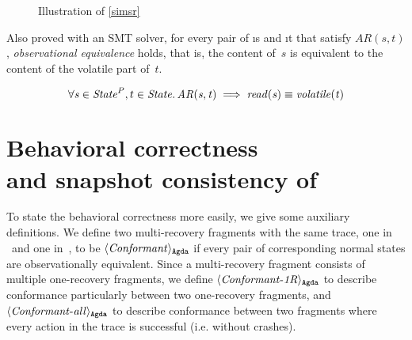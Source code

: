 	\begin{figure}[h] \centering
{}
		\caption{Illustration of \cref{simsr}}
\label{fig:sketch1}
	\end{figure}

Also proved with an SMT solver, for every pair of \i{s \in \ProgInvState} and \i{t \in \SpecState} that satisfy $AR(s,t)$, \emph{observational equivalence} holds, that is, the content of~$s$ is equivalent to the content of the volatile part of~$t$.
\begin{assumption}\label{ObsEquiv}
    $$
    \forall \mathit{s} \in \mathit{State}^P,t \in \mathit{State} \ldotp
    \mathit{AR(s, t)} \implies \mathit{read(s)} \equiv \mathit{volatile(t)}
    $$
\end{assumption}

\section{Behavioral correctness\\ and snapshot consistency of \ProgInv}

To state the behavioral correctness more easily, we give some auxiliary definitions. We define two multi-recovery fragments with the same trace, one in \Prog\ and one in~\Spec, to be $\langle \mathit{Conformant} \rangle_\mathtt{Agda}$ if every pair of corresponding normal states are observationally equivalent.
Since a multi-recovery fragment consists of multiple one-recovery fragments, we define $\langle \mathit{Conformant{\text-}1R} \rangle_\mathtt{Agda}$ to describe conformance particularly between two one-recovery fragments, and $\langle \mathit{Conformant{\text-}all} \rangle_\mathtt{Agda}$ to describe conformance between two fragments where every action in the trace is successful (i.e. without crashes).\\


